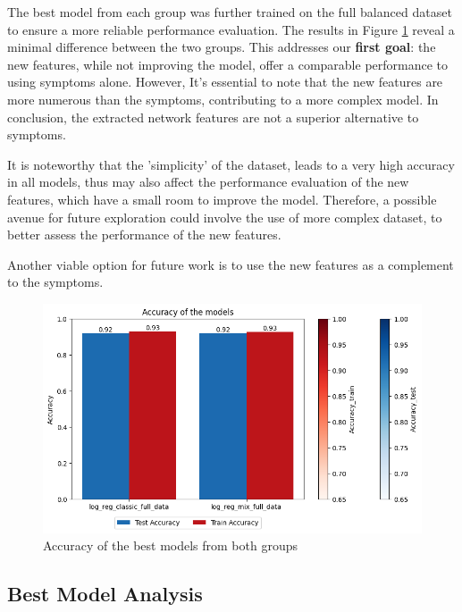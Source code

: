 \noindent
The best model from each group was further trained on the full balanced dataset to ensure a more reliable 
performance evaluation. The results in Figure \ref{fig:acc_best_models} reveal a minimal difference between 
the two groups. This addresses our \textbf{first goal}: the new features, while not improving the model, 
offer a comparable performance to using symptoms alone. However, It's essential to note that the new features are 
more numerous than the symptoms, contributing to a more complex model. In conclusion, the extracted network 
features are not a superior alternative to symptoms. 

It is noteworthy that the 'simplicity' of the dataset, leads to a very high accuracy in all models, thus may also affect the performance
evaluation of the new features, which have a small room to improve the model. Therefore, a possible avenue
for future exploration could involve the use of more complex dataset, to better assess the performance of the
new features.

Another viable option for future work is to use the new features as a complement to the symptoms.




\begin{figure}[H]
	\centering
	\includegraphics[width=\columnwidth]{images/acc_best_models.png}
	\caption{Accuracy of the best models from both groups}
	\label{fig:acc_best_models}
\end{figure}




\subsection{Best Model Analysis}



